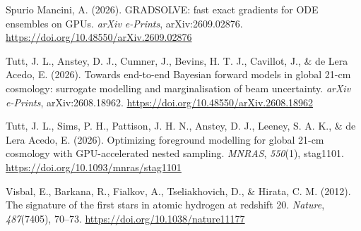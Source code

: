 \documentclass[
]{article}
\newlength{\cslhangindent}
\newenvironment{CSLReferences}[2] %
 {\begin{list}{}{%
  \setlength{\itemindent}{0pt}
  \setlength{\leftmargin}{0pt}
  \setlength{\parsep}{0pt}
  \ifodd #1
   \setlength{\leftmargin}{\cslhangindent}
   \setlength{\itemindent}{-1\cslhangindent}
  \fi
  \setlength{\itemsep}{#2\baselineskip}}}
 {\end{list}}
\begin{document}
\begin{CSLReferences}{1}{0}
Spurio Mancini, A. (2026). {GRADSOLVE: fast exact gradients for ODE
ensembles on GPUs}. \emph{arXiv e-Prints}, arXiv:2609.02876.
\url{https://doi.org/10.48550/arXiv.2609.02876}

Tutt, J. L., Anstey, D. J., Cumner, J., Bevins, H. T. J., Cavillot, J.,
\& de Lera Acedo, E. (2026). {Towards end-to-end Bayesian forward models
in global 21-cm cosmology: surrogate modelling and marginalisation of
beam uncertainty}. \emph{arXiv e-Prints}, arXiv:2608.18962.
\url{https://doi.org/10.48550/arXiv.2608.18962}

Tutt, J. L., Sims, P. H., Pattison, J. H. N., Anstey, D. J., Leeney, S.
A. K., \& de Lera Acedo, E. (2026). {Optimizing foreground modelling for
global 21-cm cosmology with GPU-accelerated nested sampling}.
\emph{MNRAS}, \emph{550}(1), stag1101.
\url{https://doi.org/10.1093/mnras/stag1101}

Visbal, E., Barkana, R., Fialkov, A., Tseliakhovich, D., \& Hirata, C.
M. (2012). {The signature of the first stars in atomic hydrogen at
redshift 20}. \emph{Nature}, \emph{487}(7405), 70--73.
\url{https://doi.org/10.1038/nature11177}

\end{CSLReferences}
\end{document}
